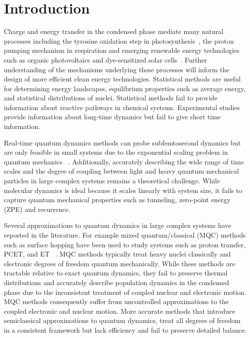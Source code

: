 \documentclass[phd,tocprelim]{cornell}
\begin{document}
\chapter{Introduction}

Charge and energy transfer in the condensed phase mediate many natural processes including the tyrosine oxidation step in photosynthesis~\cite{huynh2007, cukier1998, SHS2008, warren2010}, the proton pumping mechanism in respiration and emerging renewable energy technologies such as organic photovoltaics and dye-sensitized solar cells~\cite{wikstrom1989,nocera17}. Further understanding of the mechanisms underlying these processes will inform the design of more efficient clean energy technologies. Statistical methods are useful for determining energy landscapes, equilibrium properties such as average energy, and statistical distributions of nuclei. Statistical methods fail to provide information about reactive pathways in chemical systems. Experimental studies provide information about long-time dynamics but fail to give short time information.


Real-time quantum dynamics methods can probe subfemtosecond dynamics but are only feasible in small systems due to the exponential scaling problem in quantum mechanics ~\cite{MAKRI1999}. Additionally, accurately describing the wide range of time scales and the degree of coupling between light and heavy quantum mechanical particles in large complex systems remains a theoretical challenge. While molecular dynamics is ideal because it scales linearly with system size, it fails to capture quantum mechanical properties such as tunneling, zero-point energy (ZPE) and recurrence.


Several approximations to quantum dynamics in large complex systems have reported in the literature. For example mixed quantum/classical (MQC) methods such as surface hopping have been used to study systems such as proton transfer, PCET, and ET  ~\cite{SHS2008,shs2010-2,SHS2015}. MQC methods typically treat heavy nuclei classically and electronic degrees of freedom quantum mechanically. While these methods are tractable relative to exact quantum dynamics, they fail to preserve thermal distributions and accurately describe population dynamics in the condensed phase  due to the inconsistent treatment of coupled nuclear and electronic motion. MQC methods consequently suffer from uncontrolled approximations to the coupled electronic and nuclear motion. More accurate methods that introduce semiclassical approximations to quantum dynamics, treat all degrees of freedom in a consistent framework but lack efficiency and fail to preserve detailed balance. 
\end{document}
